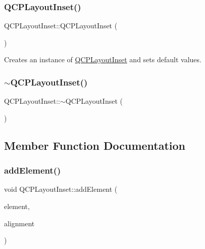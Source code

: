 \subsubsection{\texorpdfstring{Q\+C\+P\+Layout\+Inset()}{QCPLayoutInset()}}
{\footnotesize\ttfamily Q\+C\+P\+Layout\+Inset\+::\+Q\+C\+P\+Layout\+Inset (\begin{DoxyParamCaption}{ }\end{DoxyParamCaption})\hspace{0.3cm}{\ttfamily [explicit]}}

Creates an instance of \hyperlink{class_q_c_p_layout_inset}{Q\+C\+P\+Layout\+Inset} and sets default values. \mbox{\label{class_q_c_p_layout_inset_a7d0e5647b2e92df92abab532441db112}} 
\subsubsection{\texorpdfstring{$\sim$\+Q\+C\+P\+Layout\+Inset()}{~QCPLayoutInset()}}
{\footnotesize\ttfamily Q\+C\+P\+Layout\+Inset\+::$\sim$\+Q\+C\+P\+Layout\+Inset (\begin{DoxyParamCaption}{ }\end{DoxyParamCaption})\hspace{0.3cm}{\ttfamily [virtual]}}



\subsection{Member Function Documentation}
\mbox{\label{class_q_c_p_layout_inset_ad61529eb576af7f04dff94abb10c745a}} 
\subsubsection{\texorpdfstring{add\+Element()}{addElement()}\hspace{0.1cm}{\footnotesize\ttfamily [1/2]}}
{\footnotesize\ttfamily void Q\+C\+P\+Layout\+Inset\+::add\+Element (\begin{DoxyParamCaption}\item[{\hyperlink{class_q_c_p_layout_element}{Q\+C\+P\+Layout\+Element} $\ast$}]{element,  }\item[{Qt\+::\+Alignment}]{alignment }\end{DoxyParamCaption})}

